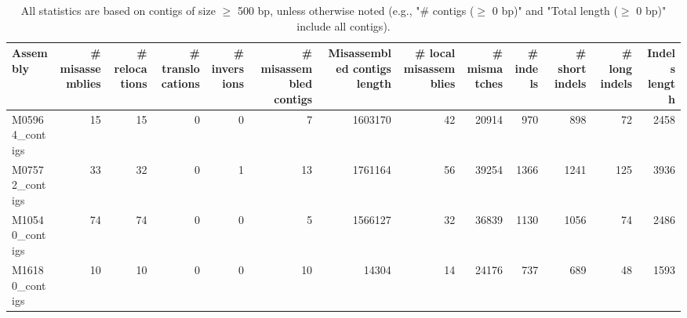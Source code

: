 \documentclass[12pt,a4paper]{article}
\begin{document}
\begin{table}[ht]
\begin{center}
\caption{All statistics are based on contigs of size $\geq$ 500 bp, unless otherwise noted (e.g., "\# contigs ($\geq$ 0 bp)" and "Total length ($\geq$ 0 bp)" include all contigs).}
\begin{tabular}{|l*{12}{|r}|}
\hline
Assembly & \# misassemblies &     \# relocations &     \# translocations &     \# inversions & \# misassembled contigs & Misassembled contigs length & \# local misassemblies & \# mismatches & \# indels &     \# short indels &     \# long indels & Indels length \\ \hline
M05964\_contigs & 15 & 15 & 0 & 0 & 7 & 1603170 & 42 & 20914 & 970 & 898 & 72 & 2458 \\ \hline
M07572\_contigs & 33 & 32 & 0 & 1 & 13 & 1761164 & 56 & 39254 & 1366 & 1241 & 125 & 3936 \\ \hline
M10540\_contigs & 74 & 74 & 0 & 0 & 5 & 1566127 & 32 & 36839 & 1130 & 1056 & 74 & 2486 \\ \hline
M16180\_contigs & 10 & 10 & 0 & 0 & 10 & 14304 & 14 & 24176 & 737 & 689 & 48 & 1593 \\ \hline
\end{tabular}
\end{center}
\end{table}
\end{document}
